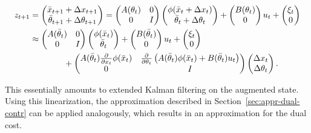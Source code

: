 \begin{fullwidth}\vspace{-\baselineskip}
\begin{equation}
  \begin{split}
    z_{t+1} &=
    \begin{pmatrix}
      \bar{x}_{t+1} + \Delta x_{t+1} \\\bar{\theta}_{t+1} +
\Delta\theta_{t+1}
    \end{pmatrix} =
    \begin{pmatrix}
      A(\theta_t) & 0 \\ 0 & I
    \end{pmatrix}
    \begin{pmatrix}
      \phi(\bar{x}_t+\Delta x_t)\\ \bar{\theta}_t + \Delta\theta_t
    \end{pmatrix}
    +
    \begin{pmatrix}
      B(\theta_t) \\ 0
    \end{pmatrix}u_t +
    \begin{pmatrix}
      \xi_t \\ 0
    \end{pmatrix}\\
    &\approx
    \begin{pmatrix}
      A(\bar\theta_t) & 0 \\ 0 & I
    \end{pmatrix}
    \begin{pmatrix}
      \phi(\bar x_t)\\ \bar{\theta}_t
    \end{pmatrix} +
    \begin{pmatrix}
      B(\bar{\theta}_t) \\ 0
    \end{pmatrix}u_t +
    \begin{pmatrix}
      \xi_t \\ 0
    \end{pmatrix}
    \\
    &\qquad\qquad+
    \begin{pmatrix}
      A(\bar{\theta}_t)\frac{\partial}{\partial x_t}\phi(\bar x_t) &
      \frac{\partial}{\partial \theta_t}\left( A(\bar {\theta}_t) \phi(\bar x_t)
      + B(\bar{\theta}_t)u_t\right)\\
      0 & I
    \end{pmatrix}
    \begin{pmatrix}
      \Delta x_t \\ \Delta \theta_t
    \end{pmatrix}.
  \end{split}
\end{equation}
\end{fullwidth}
This essentially amounts to extended Kalman filtering on the augmented
state. Using this linearization, the approximation described in
Section~\ref{sec:appr-dual-contr} can be applied analogously, which results in
an approximation for the dual cost.


